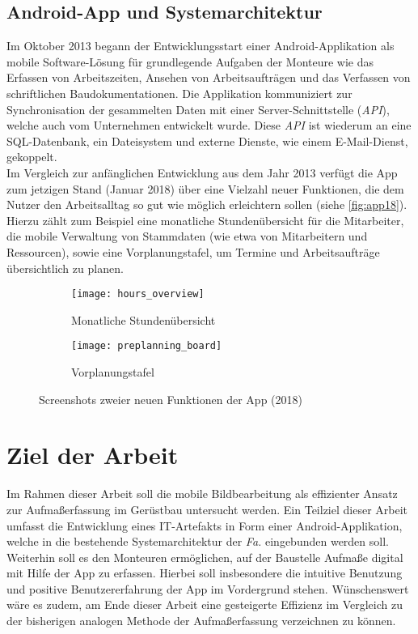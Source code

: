 \subsection{Android-App und Systemarchitektur}
Im Oktober 2013 begann der Entwicklungsstart einer Android-Applikation als mobile Software-Lösung für grundlegende Aufgaben der Monteure wie das Erfassen von Arbeitszeiten, Ansehen von Arbeitsaufträgen und das Verfassen von schriftlichen Baudokumentationen.
Die Applikation kommuniziert zur Synchronisation der gesammelten Daten mit einer Server-Schnittstelle (\emph{API}), welche auch vom Unternehmen entwickelt wurde.
Diese \emph{API} ist wiederum an eine SQL-Datenbank, ein Dateisystem und externe Dienste, wie einem E-Mail-Dienst, gekoppelt. \\

Im Vergleich zur anfänglichen Entwicklung aus dem Jahr 2013 verfügt die App zum jetzigen Stand (Januar 2018) über eine Vielzahl neuer Funktionen, die dem Nutzer den Arbeitsalltag so gut wie möglich erleichtern sollen (siehe \autoref{fig:app18}).
Hierzu zählt zum Beispiel eine monatliche Stundenübersicht für die Mitarbeiter, die mobile Verwaltung von Stammdaten (wie etwa von Mitarbeitern und Ressourcen), sowie eine Vorplanungstafel, um Termine und Arbeitsaufträge übersichtlich zu planen. 

\begin{figure}[h]
  \centering
  \begin{subfigure}[t]{0.4\textwidth}
    \texttt{[image: hours\_overview]}
    \caption{Monatliche Stundenübersicht}
  \end{subfigure}
  \begin{subfigure}[t]{0.4\textwidth}
    \texttt{[image: preplanning\_board]}
    \caption{Vorplanungstafel}
  \end{subfigure}
  \caption{Screenshots zweier neuen Funktionen der App (2018)}
  \label{fig:app18}
\end{figure}

\section{Ziel der Arbeit}
Im Rahmen dieser Arbeit soll die mobile Bildbearbeitung als effizienter Ansatz zur Aufmaßerfassung im Gerüstbau untersucht werden.
Ein Teilziel dieser Arbeit umfasst die Entwicklung eines IT-Artefakts in Form einer Android-Applikation, welche in die bestehende Systemarchitektur der \emph{Fa.} \vr{} eingebunden werden soll.
Weiterhin soll es den Monteuren ermöglichen, auf der Baustelle Aufmaße digital mit Hilfe der App zu erfassen.
Hierbei soll insbesondere die intuitive Benutzung und positive Benutzererfahrung der App im Vordergrund stehen.
Wünschenswert wäre es zudem, am Ende dieser Arbeit eine gesteigerte Effizienz im Vergleich zu der bisherigen analogen Methode der Aufmaßerfassung verzeichnen zu können.

